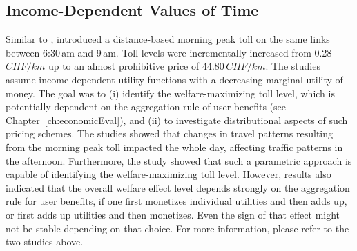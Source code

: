 \subsection{Income-Dependent Values of Time}
Similar to \citet{RieserEtAl2008ITMEveningToll}, \citet{KickhoeferEtAl2010EconomicEvaluationPublicAcceptanceRoadPricingKuhmo, Kickhoefer_PhDThesis_2014} introduced a distance-based morning peak toll on the same links between 6:30\,am and 9\,am. Toll levels were incrementally increased from 0.28\,$CHF/km$ up to an almost prohibitive price of 44.80\,$CHF/km$. The studies assume income-dependent utility functions with a decreasing marginal utility of money. The goal was to (i) identify the welfare-maximizing \citep[see e.g.,][Section~2.5]{TirachiniHensherRose_TransResB_2014}
toll level, which is potentially dependent on the aggregation rule of user benefits (see Chapter~\ref{ch:economicEval}), and (ii) to investigate distributional aspects of such pricing schemes.
%
The studies showed that changes in travel patterns resulting from the morning peak toll impacted the whole day, affecting traffic patterns in the afternoon.
%
Furthermore, the study showed that such a parametric approach is capable of identifying the welfare-maximizing toll level. However, results also indicated that the overall welfare effect level depends strongly on the aggregation rule for user benefits, \ie if one first monetizes individual utilities and then adds up, or first adds up utilities and then monetizes. 
Even the sign of that effect might not be stable depending on that choice.
%
For more information, please refer to the two studies above.


